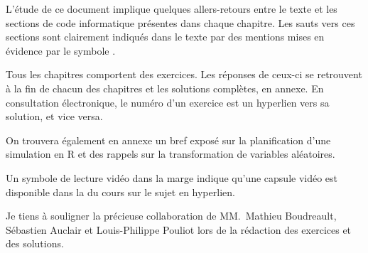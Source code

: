 L'étude de ce document implique quelques allers-retours entre le texte
et les sections de code informatique présentes dans chaque chapitre.
Les sauts vers ces sections sont clairement indiqués dans le texte par
des mentions mises en évidence par le symbole {\faMapSigns}.

Tous les chapitres comportent des exercices. Les réponses de ceux-ci se
retrouvent à la fin de chacun des chapitres et les solutions complètes,
en annexe. En consultation électronique, le numéro d'un exercice est
un hyperlien vers sa solution, et vice versa.

On trouvera également en annexe un bref exposé sur la planification
d'une simulation en R et des rappels sur la transformation de
variables aléatoires.

Un symbole de lecture vidéo dans la marge indique qu'une capsule vidéo
est disponible dans la %
du cours sur le sujet en hyperlien.

Je tiens à souligner la précieuse collaboration de MM.~Mathieu
Boudreault, Sébastien Auclair et Louis-Philippe Pouliot lors de la
rédaction des exercices et des solutions.

